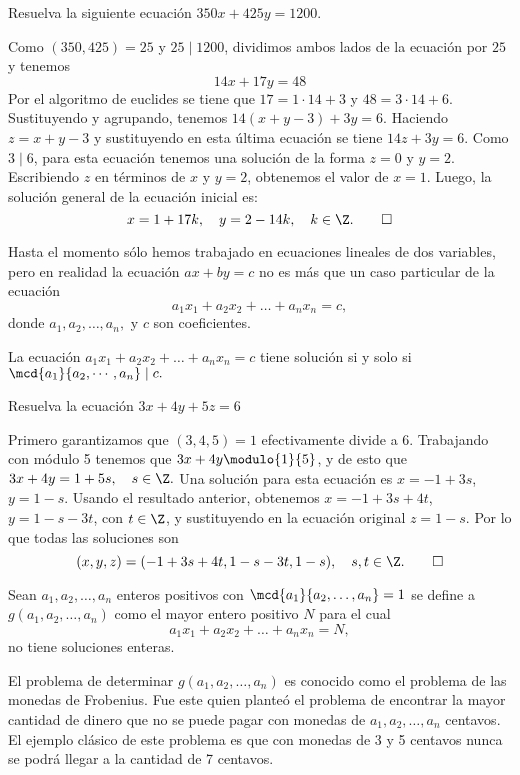 \begin{example}
    Resuelva la siguiente ecuación $350x + 425y = 1200$.
\end{example}
\begin{solution}
    Como $(350,425)=25$ y $25 \mid 1200$, dividimos ambos lados de la ecuación por $25$ y tenemos
    \[
        14x+17y=48
    \]
    Por el algoritmo de euclides se tiene que $17 = 1\cdot14+3$ y $48=3\cdot14+6$.
    Sustituyendo y agrupando, tenemos $14(x+y-3)+3y=6.$
    Haciendo $z=x+y-3$ y sustituyendo en esta última ecuación se tiene $14z+3y=6.$
    Como $3\mid6$, para esta ecuación tenemos una solución de la forma $z=0$ y $y=2$.
    Escribiendo $z$ en términos de $x$ y $y=2$, obtenemos el valor de $x=1$.
    Luego, la solución general de la ecuación inicial es:
    \[
        x=1+17k, \quad y=2-14k, \quad k \in \Z. \qedhere
    \]
\end{solution}

Hasta el momento sólo hemos trabajado en ecuaciones lineales de dos variables, pero en realidad la ecuación $ax+by=c$ no es más que un caso particular de la ecuación
\[
    a_1 x_1 + a_2 x_2 + \ldots + a_n x_n = c,
\]
donde $a_1, a_2, \dots, a_n,$ y $c$ son coeficientes.

\begin{theorem.box}{}{}
    La ecuación $a_1 x_1 + a_2 x_2 + \ldots + a_n x_n = c$ tiene solución si y solo si $\mcd {a_1}{a_2,\cdots,a_n} \mid c.$
\end{theorem.box}

\begin{example}
    Resuelva la ecuación $3x+4y+5z=6$
\end{example}
\begin{solution}
    Primero garantizamos que $(3,4,5)=1$ efectivamente divide a 6.
    Trabajando con módulo 5 tenemos que $3x+4y\modulo{1}{5}$, y de esto que $3x+4y=1+5s, \quad s \in \Z.$
    Una solución para esta ecuación es $x=-1+3s$, $y=1-s$.
    Usando el resultado anterior, obtenemos $x=-1+3s+4t$, $y = 1-s-3t$, con $t \in \Z$, y sustituyendo en la ecuación original $z=1-s$.
    Por lo que todas las soluciones son
    \[
        (x,y,z)=(-1+3s+4t,1-s-3t,1-s), \quad s,t \in \Z.\qedhere
    \]
\end{solution}

\begin{definition.box}{}{}
    Sean  $a_1,a_2,\ldots,a_n$ enteros positivos con $\mcd{a_1}{a_2,\ldots,a_n} = 1$ se define a $g(a_1,a_2,\ldots,a_n)$
    como el mayor entero positivo $N$ para el cual
    \[
        a_1 x_1 + a_2 x_2 + \ldots + a_n x_n = N,
    \]
    no tiene soluciones enteras.
\end{definition.box}
El problema de determinar $g(a_1,a_2,\ldots,a_n)$ es conocido como el problema de las monedas de Frobenius.
Fue este quien planteó el problema de encontrar la mayor cantidad de dinero que no se puede pagar con monedas de $a_1, a_2,\ldots,a_n$ centavos.
El ejemplo clásico de este problema es que con monedas de 3 y 5 centavos nunca se podrá llegar a la cantidad de 7 centavos.

